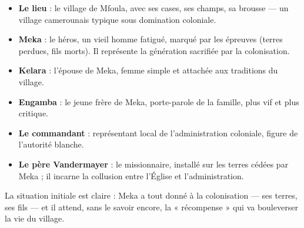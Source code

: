 \documentclass[11pt]{article}
\begin{document}
\begin{itemize}
\item \textbf{Le lieu} : le village de Mfoula, avec ses cases, ses champs, sa brousse — un village camerounais typique sous domination coloniale.
\item \textbf{Meka} : le héros, un vieil homme fatigué, marqué par les épreuves (terres perdues, fils morts). Il représente la génération sacrifiée par la colonisation.
\item \textbf{Kelara} : l'épouse de Meka, femme simple et attachée aux traditions du village.
\item \textbf{Engamba} : le jeune frère de Meka, porte-parole de la famille, plus vif et plus critique.
\item \textbf{Le commandant} : représentant local de l'administration coloniale, figure de l'autorité blanche.
\item \textbf{Le père Vandermayer} : le missionnaire, installé sur les terres cédées par Meka ; il incarne la collusion entre l'Église et l'administration.
\end{itemize}

La situation initiale est claire : Meka a tout donné à la colonisation — ses terres, ses fils — et il attend, sans le savoir encore, la « récompense » qui va bouleverser la vie du village.
\end{document}
